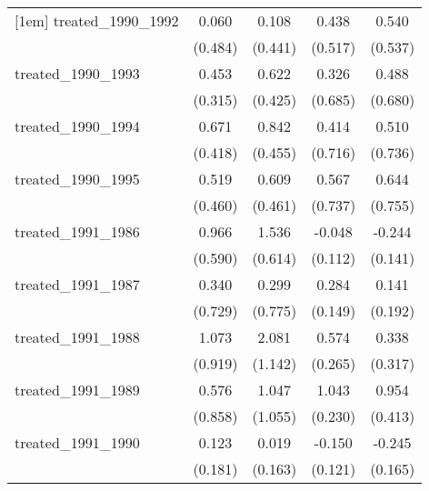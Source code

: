 {\begin{tabular}{l*{4}{c}}
[1em]
treated\_1990\_1992&       0.060         &       0.108         &       0.438         &       0.540         \\
            &     (0.484)         &     (0.441)         &     (0.517)         &     (0.537)         \\
[1em]
treated\_1990\_1993&       0.453         &       0.622         &       0.326         &       0.488         \\
            &     (0.315)         &     (0.425)         &     (0.685)         &     (0.680)         \\
[1em]
treated\_1990\_1994&       0.671         &       0.842         &       0.414         &       0.510         \\
            &     (0.418)         &     (0.455)         &     (0.716)         &     (0.736)         \\
[1em]
treated\_1990\_1995&       0.519         &       0.609         &       0.567         &       0.644         \\
            &     (0.460)         &     (0.461)         &     (0.737)         &     (0.755)         \\
[1em]
treated\_1991\_1986&       0.966         &       1.536\sym{*}  &      -0.048         &      -0.244         \\
            &     (0.590)         &     (0.614)         &     (0.112)         &     (0.141)         \\
[1em]
treated\_1991\_1987&       0.340         &       0.299         &       0.284         &       0.141         \\
            &     (0.729)         &     (0.775)         &     (0.149)         &     (0.192)         \\
[1em]
treated\_1991\_1988&       1.073         &       2.081         &       0.574\sym{*}  &       0.338         \\
            &     (0.919)         &     (1.142)         &     (0.265)         &     (0.317)         \\
[1em]
treated\_1991\_1989&       0.576         &       1.047         &       1.043\sym{***}&       0.954\sym{*}  \\
            &     (0.858)         &     (1.055)         &     (0.230)         &     (0.413)         \\
[1em]
treated\_1991\_1990&       0.123         &       0.019         &      -0.150         &      -0.245         \\
            &     (0.181)         &     (0.163)         &     (0.121)         &     (0.165)         \\

\end{tabular}}
